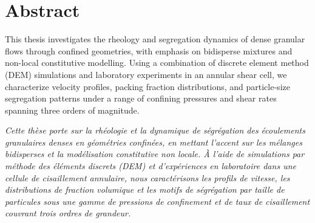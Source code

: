 \chapter*{Abstract}

\begin{abstractbox}
\noindent This thesis investigates the rheology and segregation dynamics of dense granular flows through confined geometries, with emphasis on bidisperse mixtures and non-local constitutive modelling. Using a combination of discrete element method (DEM) simulations and laboratory experiments in an annular shear cell, we characterize velocity profiles, packing fraction distributions, and particle-size segregation patterns under a range of confining pressures and shear rates spanning three orders of magnitude.

\vspace{8pt}

\noindent
\textit{Cette th\`ese porte sur la rh\'eologie et la dynamique de s\'egr\'egation des \'ecoulements granulaires denses en g\'eom\'etries confin\'ees, en mettant l'accent sur les m\'elanges bidisperses et la mod\'elisation constitutive non locale. \`A l'aide de simulations par m\'ethode des \'el\'ements discrets (DEM) et d'exp\'eriences en laboratoire dans une cellule de cisaillement annulaire, nous caract\'erisons les profils de vitesse, les distributions de fraction volumique et les motifs de s\'egr\'egation par taille de particules sous une gamme de pressions de confinement et de taux de cisaillement couvrant trois ordres de grandeur.}
\end{abstractbox}

\vspace{18pt}
